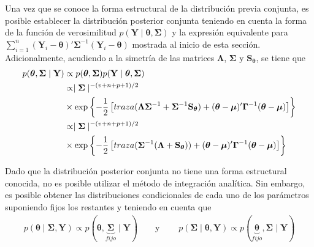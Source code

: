 \documentclass[
  10pt,
  spanish,
]{book}
\theoremstyle{definition}
\theoremstyle{definition}
\theoremstyle{definition}
\theoremstyle{definition}
\theoremstyle{remark}
\begin{document}
Una vez que se conoce la forma estructural de la distribución previa conjunta, es posible establecer la distribución posterior conjunta teniendo en cuenta la forma de la función de verosimilitud \(p(\mathbf{Y} \mid \boldsymbol \theta,\boldsymbol \Sigma)\) y la expresión equivalente para \(\sum_{i=1}^n(\mathbf{Y}_i-\boldsymbol \theta)'\boldsymbol \Sigma^{-1}(\mathbf{Y}_i-\boldsymbol \theta)\) mostrada al inicio de esta sección. Adicionalmente, acudiendo a la simetría de las matrices \(\boldsymbol \Lambda\), \(\boldsymbol \Sigma\) y \(\mathbf{S}_{\boldsymbol \theta}\), se tiene que
\begin{align}
p(\boldsymbol \theta,\boldsymbol \Sigma\mid \mathbf{Y})&\propto p(\boldsymbol \theta,\boldsymbol \Sigma)p(\mathbf{Y} \mid \boldsymbol \theta,\boldsymbol \Sigma)\notag\\
&\propto \mid \boldsymbol \Sigma\mid ^{-(v+n+p+1)/2}\notag\\
&\times
\exp\left\{ -\frac{1}{2}\left[traza(\boldsymbol \Lambda\boldsymbol \Sigma^{-1}+\boldsymbol \Sigma^{-1}\mathbf{S}_{\boldsymbol \theta})+
                                (\boldsymbol \theta-\boldsymbol \mu)'\boldsymbol \Gamma^{-1}(\boldsymbol \theta-\boldsymbol \mu)\right]\right\}\notag\\
                              &\propto \mid \boldsymbol \Sigma\mid ^{-(v+n+p+1)/2}\notag\\
                              &\times
                              \exp\left\{ -\frac{1}{2}\left[traza(\boldsymbol \Sigma^{-1}(\boldsymbol \Lambda+\mathbf{S}_{\boldsymbol \theta}))+
                              (\boldsymbol \theta-\boldsymbol \mu)'\boldsymbol \Gamma^{-1}(\boldsymbol \theta-\boldsymbol \mu)\right]\right\}
\end{align}

Dado que la distribución posterior conjunta no tiene una forma estructural conocida, no es posible utilizar el método de integración analítica. Sin embargo, es posible obtener las distribuciones condicionales de cada uno de los parámetros suponiendo fijos los restantes y teniendo en cuenta que
\begin{align*}
p(\boldsymbol \theta\mid \boldsymbol \Sigma,\mathbf{Y})\propto p(\boldsymbol \theta,\underbrace{\boldsymbol \Sigma}_{fijo} \mid \mathbf{Y})
\ \ \ \ \ \ \ \ \ \text{y} \ \ \ \ \ \ \ \ \ \
p(\boldsymbol \Sigma\mid \boldsymbol \theta,\mathbf{Y})\propto p(\underbrace{\boldsymbol \theta}_{fijo},\boldsymbol \Sigma\mid \mathbf{Y})
\end{align*}
\end{document}
